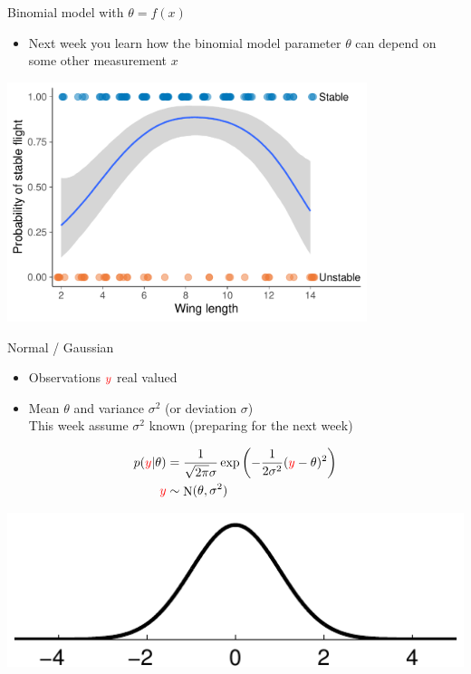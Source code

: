 \documentclass[english,t]{beamer}
\DeclareMathOperator{\N}{N}
\begin{document}
\begin{frame}{Binomial model with $\theta=f(x)$}

  \begin{itemize}
  \item Next week you learn how the binomial model parameter $\theta$
    can depend on some other measurement $x$
  \end{itemize}
  
  \includegraphics[width=10.5cm]{figs/helicopter_stable_brms.pdf}
  
\end{frame}


\begin{frame}{Normal / Gaussian}

  \begin{itemize}
  \item Observations ${\color{red}y}$ real valued
  \item Mean $\theta$ and variance $\sigma^2$ (or deviation $\sigma$)\\
    This week assume $\sigma^2$ known (preparing for the next week)
  \end{itemize}
  \vskip -2mm
  \begin{align*}
    p({\color{red}y}|\theta)&=\frac{1}{\sqrt{2\pi}\sigma}\exp\left(-\frac{1}{2\sigma^2}({\color{red}y}-\theta)^2\right)\\
    {\color{red}y} & \sim \N(\theta,\sigma^2)
  \end{align*}

  \begin{center}
    \includegraphics[clip]{kuva2b_1}
  \end{center}
\end{frame}
\end{document}
